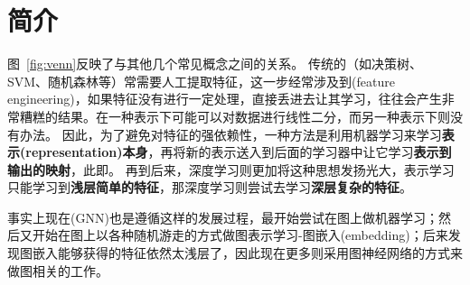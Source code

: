 
\section{简介} %
图~\ref{fig:venn}反映了与其他几个常见概念之间的关系。
传统的（如决策树、SVM、随机森林等）常需要人工提取特征，这一步经常涉及到(feature engineering)，如果特征没有进行一定处理，直接丢进去让其学习，往往会产生非常糟糕的结果。在一种表示下可能可以对数据进行线性二分，而另一种表示下则没有办法。
因此，为了避免对特征的强依赖性，一种方法是利用机器学习来学习\textbf{表示(representation)本身}，再将新的表示送入到后面的学习器中让它学习\textbf{表示到输出的映射}，此即。
再到后来，深度学习则更加将这种思想发扬光大，表示学习只能学习到\textbf{浅层简单的特征}，那深度学习则尝试去学习\textbf{深层复杂的特征}。

\bigskip
\begin{tcolorbox}
事实上现在(GNN)也是遵循这样的发展过程，最开始尝试在图上做机器学习\cite{yao:graph_ml_2009,li:distributed_2013,gemulla:mf_2011}；然后又开始在图上以各种随机游走的方式做图表示学习-图嵌入(embedding)\cite{perozzi:deepwalk_2014,grover:node2vec_2016}；后来发现图嵌入能够获得的特征依然太浅层了，因此现在更多则采用图神经网络\cite{kipf:gcn_2017,hamilton:graphsage_2017,li:gated_2016,velickovic:gat_2018}的方式来做图相关的工作。
\end{tcolorbox}

